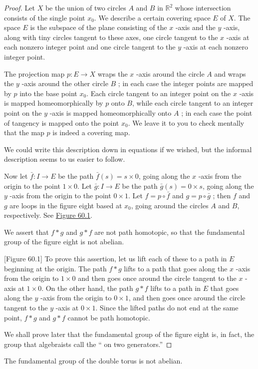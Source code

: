 \begin{proof}
Let \(X\) be the union of two circles \(A\) and \(B\) in \(\mathbb{R}^{2}\) whose intersection consists of the single point \(x_{0}\). We describe a certain covering space \(E\) of \(X\).
The space \(E\) is the subspace of the plane consisting of the \(x\) -axis and the \(y\) -axis, along with tiny circles tangent to these axes, one circle tangent to the \(x\) -axis at each nonzero integer point and one circle tangent to the \(y\) -axis at each nonzero integer point.

The projection map \(p : E \rightarrow X\) wraps the \(x\) -axis around the circle \(A\) and wraps the \(y\) -axis around the other circle \(B\) ; in each case the integer points are mapped by \(p\) into the base point \(x_{0}\). Each circle tangent to an integer point on the \(x\) -axis is mapped homeomorphically by \(p\) onto \(B\), while each circle tangent to an integer point on the \(y\) -axis is mapped homeomorphically onto \(A\) ; in each case the point of tangency is mapped onto the point \(x_{0}\). We leave it to you to check mentally that the map \(p\) is indeed a covering map.

We could write this description down in equations if we wished, but the informal description seems to us easier to follow.

Now let \(\bar{f} : I \rightarrow E\) be the path \(\bar{f}( s) = s \times 0\), going along the \(x\) -axis from the origin to the point \(1 \times 0\). Let \(\bar{g} : I \rightarrow E\) be the path \(\bar{g}( s) = 0 \times s\), going along the \(y\) -axis from the origin to the point \(0 \times 1\). Let \(f = p \circ \bar{f}\) and \(g = p \circ \bar{g}\) ; then \(f\) and \(g\) are loops in the figure eight based at \(x_{0}\), going around the circles \(A\) and \(B\), respectively. See \hyperref[fig:60.1]{Figure 60.1}.

We assert that \(f * g\) and \(g * f\) are not path homotopic, so that the fundamental group of the figure eight is not abelian.

[Figure 60.1]
To prove this assertion, let us lift each of these to a path in \(E\) beginning at the origin. The path \(f * g\) lifts to a path that goes along the \(x\) -axis from the origin to \(1 \times 0\) and then goes once around the circle tangent to the \(x\) -axis at \(1 \times 0\). On the other hand, the path \(g * f\) lifts to a path in \(E\) that goes along the \(y\) -axis from the origin to \(0 \times 1\), and then goes once around the circle tangent to the \(y\) -axis at \(0 \times 1\). Since the lifted paths do not end at the same point, \(f * g\) and \(g * f\) cannot be path homotopic.

We shall prove later that the fundamental group of the figure eight is, in fact, the group that algebraists call the `` on two generators.''
\end{proof}
\begin{theorem}
\label{thm:\thetheorem}
The fundamental group of the double torus is not abelian.
\end{theorem}

